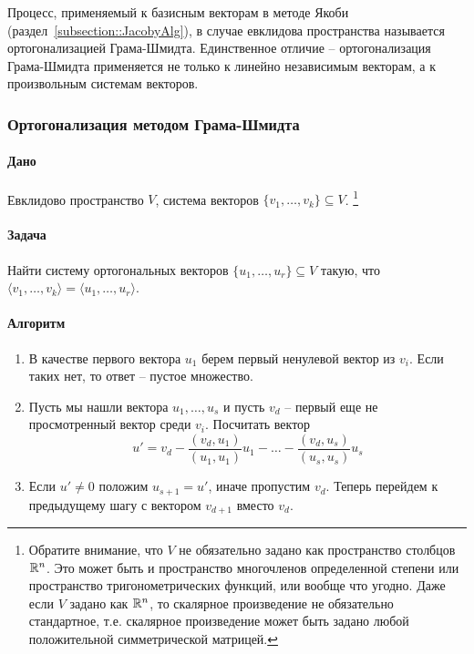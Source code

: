 Процесс, применяемый к базисным векторам в методе Якоби (раздел~\ref{subsection::JacobyAlg}), в случае евклидова пространства называется ортогонализацией Грама-Шмидта.
Единственное отличие -- ортогонализация Грама-Шмидта применяется не только к линейно независимым векторам, а к произвольным системам векторов.

\subsubsection*{Ортогонализация методом Грама-Шмидта}

\paragraph{Дано}

Евклидово пространство $V$, система векторов $\{v_1,\ldots,v_k\}\subseteq V$.%
\footnote{Обратите внимание, что $V$ не обязательно задано как пространство столбцов $\mathbb R^{n}$.
Это может быть и пространство многочленов определенной степени или пространство тригонометрических функций, или вообще что угодно.
Даже если $V$ задано как $\mathbb R^{n}$, то скалярное произведение не обязательно стандартное, т.е. скалярное произведение может быть задано любой положительной симметрической матрицей.}

\paragraph{Задача}

Найти систему ортогональных векторов $\{u_1,\ldots,u_r\}\subseteq V$ такую, что $\langle v_1,\ldots,v_k\rangle = \langle u_1,\ldots,u_r\rangle$.

\paragraph{Алгоритм}

\begin{enumerate}
\item В качестве первого вектора $u_1$ берем первый ненулевой вектор из $v_i$.
Если таких нет, то ответ -- пустое множество.

\item Пусть мы нашли вектора $u_1,\ldots,u_s$ и пусть $v_d$ -- первый еще не просмотренный вектор среди $v_i$.
Посчитать вектор 
\[
u' = v_d - \frac{(v_d, u_1)}{(u_1,u_1)} u_1 - \ldots - \frac{(v_d, u_s)}{(u_s, u_s)}u_s
\]

\item Если $u' \neq 0$ положим $u_{s+1} = u'$, иначе пропустим $v_d$.
Теперь перейдем к предыдущему шагу с вектором $v_{d+1}$ вместо $v_d$.
\end{enumerate}

